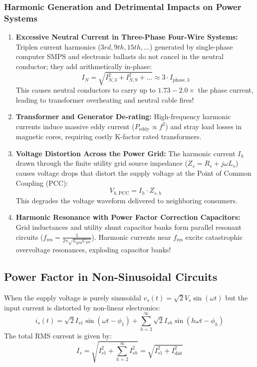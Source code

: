 \documentclass[11pt,a4paper]{article}
\begin{document}
\subsubsection{Harmonic Generation and Detrimental Impacts on Power Systems}
\begin{enumerate}[leftmargin=*]
  \item \textbf{Excessive Neutral Current in Three-Phase Four-Wire Systems:} Triplen current harmonics ($3rd, 9th, 15th, \dots$) generated by single-phase computer SMPS and electronic ballasts do not cancel in the neutral conductor; they add arithmetically in-phase:
  \begin{equation}
  I_N = \sqrt{I_{N,3}^2 + I_{N,9}^2 + \dots} \approx 3 \cdot I_{\text{phase},3}
  \end{equation}
  This causes neutral conductors to carry up to $1.73 - 2.0 \times$ the phase current, leading to transformer overheating and neutral cable fires!
  \item \textbf{Transformer and Generator De-rating:} High-frequency harmonic currents induce massive eddy current ($P_{\text{eddy}} \propto f^2$) and stray load losses in magnetic cores, requiring costly K-factor rated transformers.
  \item \textbf{Voltage Distortion Across the Power Grid:} The harmonic current $I_h$ drawn through the finite utility grid source impedance ($Z_s = R_s + j\omega L_s$) causes voltage drops that distort the supply voltage at the Point of Common Coupling (PCC):
  \begin{equation}
  V_{h,\text{PCC}} = I_h \cdot Z_{s,h}
  \end{equation}
  This degrades the voltage waveform delivered to neighboring consumers.
  \item \textbf{Harmonic Resonance with Power Factor Correction Capacitors:} Grid inductances and utility shunt capacitor banks form parallel resonant circuits ($f_{\text{res}} = \frac{1}{2\pi\sqrt{L_{\text{grid}} C_{\text{pfc}}}}$). Harmonic currents near $f_{\text{res}}$ excite catastrophic overvoltage resonances, exploding capacitor banks!
\end{enumerate}

\subsection{Power Factor in Non-Sinusoidal Circuits}

When the supply voltage is purely sinusoidal $v_s(t) = \sqrt{2}V_s \sin(\omega t)$ but the input current is distorted by non-linear electronics:
\begin{equation}
i_s(t) = \sqrt{2}I_{s1} \sin(\omega t - \phi_1) + \sum_{h=2}^{\infty} \sqrt{2}I_{sh} \sin(h\omega t - \phi_h)
\end{equation}
The total RMS current is given by:
\begin{equation}
I_s = \sqrt{I_{s1}^2 + \sum_{h=2}^\infty I_{sh}^2} = \sqrt{I_{s1}^2 + I_{\text{dist}}^2}
\end{equation}
\end{document}
